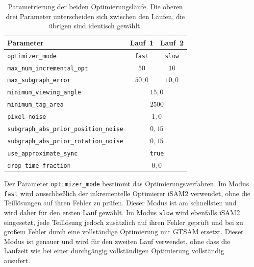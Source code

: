\begin{table}[htbp]
    \centering
    \begin{tabular}{lcc}
        \toprule
        \textbf{Parameter} & \textbf{Lauf~1} & \textbf{Lauf~2} \\
        \midrule
        \texttt{optimizer\_mode}            & \texttt{fast} & \texttt{slow} \\
        \texttt{max\_num\_incremental\_opt} & $50$          & $10$ \\
        \texttt{max\_subgraph\_error}       & $50{,}0$      & $10{,}0$ \\
        \midrule
        \texttt{minimum\_viewing\_angle}                & \multicolumn{2}{c}{$15{,}0$} \\
        \texttt{minimum\_tag\_area}                     & \multicolumn{2}{c}{$2500$} \\
        \texttt{pixel\_noise}                           & \multicolumn{2}{c}{$1{,}0$} \\
        \texttt{subgraph\_abs\_prior\_position\_noise}  & \multicolumn{2}{c}{$0{,}15$} \\
        \texttt{subgraph\_abs\_prior\_rotation\_noise}  & \multicolumn{2}{c}{$0{,}15$} \\
        \texttt{use\_approximate\_sync}                 & \multicolumn{2}{c}{\texttt{true}} \\
        \texttt{drop\_time\_fraction}                   & \multicolumn{2}{c}{$0{,}0$} \\
        \bottomrule
    \end{tabular}
    \caption{Parametrierung der beiden Optimierungsläufe. Die oberen drei Parameter unterscheiden sich zwischen den Läufen, die übrigen sind identisch gewählt.}
    \label{tab:tagslam_params_laeufe}
\end{table}
\FloatBarrier

Der Parameter \texttt{optimizer\_mode} bestimmt das Optimierungsverfahren.
Im Modus \texttt{fast} wird ausschließlich der inkrementelle Optimierer iSAM2 verwendet, ohne die Teillösungen auf ihren Fehler zu prüfen.
Dieser Modus ist am schnellsten und wird daher für den ersten Lauf gewählt.
Im Modus \texttt{slow} wird ebenfalls iSAM2 eingesetzt, jede Teillösung jedoch zusätzlich auf ihren Fehler geprüft und bei zu großem Fehler durch eine vollständige Optimierung mit GTSAM ersetzt.
Dieser Modus ist genauer und wird für den zweiten Lauf verwendet, ohne dass die Laufzeit wie bei einer durchgängig vollständigen Optimierung vollständig ausufert.


